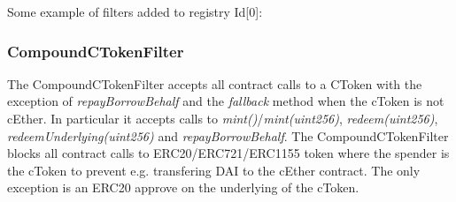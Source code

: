 \documentclass[12pt]{article}
\begin{document}
Some example of filters added to registry Id[0]:

\subsubsection{CompoundCTokenFilter}
The CompoundCTokenFilter accepts all contract calls to a CToken with the exception of \textit{repayBorrowBehalf} and the \textit{fallback} method when the cToken is not cEther. In particular it accepts calls to \textit{mint()}/\textit{mint(uint256)}, \textit{redeem(uint256)}, \textit{redeemUnderlying(uint256)} and \textit{repayBorrowBehalf}.
The CompoundCTokenFilter blocks all contract calls to ERC20/ERC721/ERC1155 token where the spender is the cToken to prevent e.g. transfering DAI to the cEther contract. The only exception is an ERC20 approve on the underlying of the cToken.
\end{document}
